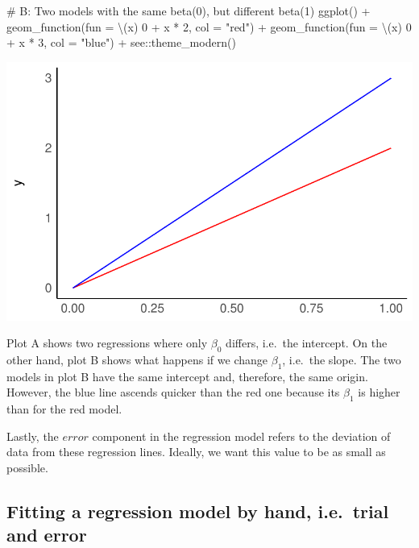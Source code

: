 \documentclass[
  letterpaper,
  DIV=11,
  numbers=noendperiod]{scrreprt}
\newenvironment{Shaded}{\begin{snugshade}}{\end{snugshade}}
\newcommand{\AttributeTok}[1]{\textcolor[rgb]{0.40,0.45,0.13}{#1}}
\newcommand{\CommentTok}[1]{\textcolor[rgb]{0.37,0.37,0.37}{#1}}
\newcommand{\DecValTok}[1]{\textcolor[rgb]{0.68,0.00,0.00}{#1}}
\newcommand{\FunctionTok}[1]{\textcolor[rgb]{0.28,0.35,0.67}{#1}}
\newcommand{\NormalTok}[1]{\textcolor[rgb]{0.00,0.23,0.31}{#1}}
\newcommand{\SpecialCharTok}[1]{\textcolor[rgb]{0.37,0.37,0.37}{#1}}
\newcommand{\StringTok}[1]{\textcolor[rgb]{0.13,0.47,0.30}{#1}}
\begin{document}
\begin{Shaded}
\begin{Highlighting}[]
\CommentTok{\# B: Two models with the same beta(0), but different beta(1)}
\FunctionTok{ggplot}\NormalTok{() }\SpecialCharTok{+}
  \FunctionTok{geom\_function}\NormalTok{(}\AttributeTok{fun =}\NormalTok{ \textbackslash{}(x) }\DecValTok{0} \SpecialCharTok{+}\NormalTok{ x }\SpecialCharTok{*} \DecValTok{2}\NormalTok{, }\AttributeTok{col =} \StringTok{"red"}\NormalTok{) }\SpecialCharTok{+}
  \FunctionTok{geom\_function}\NormalTok{(}\AttributeTok{fun =}\NormalTok{ \textbackslash{}(x) }\DecValTok{0} \SpecialCharTok{+}\NormalTok{ x }\SpecialCharTok{*} \DecValTok{3}\NormalTok{, }\AttributeTok{col =} \StringTok{"blue"}\NormalTok{) }\SpecialCharTok{+}
\NormalTok{  see}\SpecialCharTok{::}\FunctionTok{theme\_modern}\NormalTok{()}
\end{Highlighting}
\end{Shaded}

\includegraphics{13_regressions_files/figure-latex/beta-zero-beta-one-explained-diff-1.pdf}

Plot A shows two regressions where only \(\beta_0\) differs, i.e.~the
intercept. On the other hand, plot B shows what happens if we change
\(\beta_1\), i.e.~the slope. The two models in plot B have the same
intercept and, therefore, the same origin. However, the blue line
ascends quicker than the red one because its \(\beta_1\) is higher than
for the red model.

Lastly, the \(error\) component in the regression model refers to the
deviation of data from these regression lines. Ideally, we want this
value to be as small as possible.

\subsection{Fitting a regression model by hand, i.e.~trial and
error}\label{sec-fitting-a-regression-model-by-hand}
\end{document}

